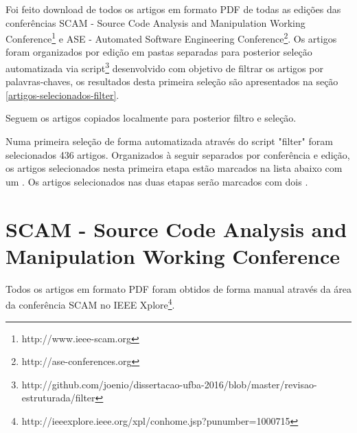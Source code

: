 
Foi feito download de todos os artigos em formato PDF de todas as edições das
conferências SCAM - Source Code Analysis and Manipulation Working
Conference\footnote{http://www.ieee-scam.org} e ASE - Automated Software
Engineering Conference\footnote{http://ase-conferences.org}.
Os artigos foram organizados por edição em pastas separadas para posterior
seleção automatizada via script\footnote{http://github.com/joenio/dissertacao-ufba-2016/blob/master/revisao-estruturada/filter} desenvolvido com objetivo de filtrar os
artigos por palavras-chaves, os resultados desta primeira seleção são apresentados
na seção \ref{artigos-selecionados-filter}.

Seguem os artigos copiados localmente para posterior filtro e seleção.

Numa primeira seleção de forma automatizada através do script "filter" foram
selecionados 436 artigos. Organizados à seguir separados por conferência e
edição, os artigos selecionados nesta primeira etapa estão marcados na lista
abaixo com um {\color{blue} \checkmark}. Os artigos selecionados nas duas
etapas serão marcados com dois {\color{blue} \checkmark \checkmark}.

%
%
%
%
%
%
%

\section{SCAM - Source Code Analysis and Manipulation Working Conference}

Todos os artigos em formato PDF foram obtidos de forma manual através da área
da conferência SCAM no IEEE
Xplore\footnote{http://ieeexplore.ieee.org/xpl/conhome.jsp?punumber=1000715}.


